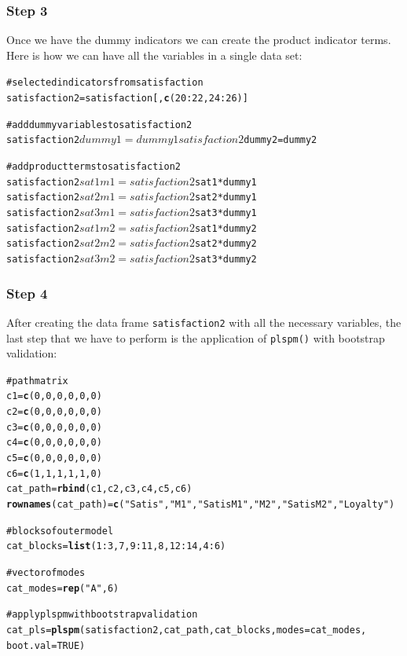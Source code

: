 \documentclass[12pt]{book}\usepackage{graphicx, color}
\makeatletter
\newcommand{\hlfunctioncall}[1]{\textcolor[rgb]{0.501960784313725,0,0.329411764705882}{\textbf{#1}}}%
\newcommand{\hlstring}[1]{\textcolor[rgb]{0.6,0.6,1}{#1}}%
\newcommand{\hlcomment}[1]{\textcolor[rgb]{0.180392156862745,0.6,0.341176470588235}{#1}}%
\newenvironment{kframe}{%
 \def\at@end@of@kframe{}%
 \ifinner\ifhmode%
  \def\at@end@of@kframe{\end{minipage}}%
  \begin{minipage}{\columnwidth}%
 \fi\fi%
 \def\FrameCommand##1{\hskip\@totalleftmargin \hskip-\fboxsep
 \colorbox{shadecolor}{##1}\hskip-\fboxsep
     \hskip-\linewidth \hskip-\@totalleftmargin \hskip\columnwidth}%
 \MakeFramed {\advance\hsize-\width
   \@totalleftmargin\z@ \linewidth\hsize
   \@setminipage}}%
 {\par\unskip\endMakeFramed%
 \at@end@of@kframe}
\newenvironment{knitrout}{}{} %
\newcommand{\fplspm}{\texttt{plspm()}}
\newcommand{\code}[1]{\texttt{#1}}
\makeatother
\begin{document}
\subsubsection*{Step 3}
Once we have the dummy indicators we can create the product indicator terms. Here is how we can have all the variables in a single data set:
\begin{knitrout}
\color{fgcolor}\begin{kframe}
\begin{alltt}
\hlcomment{# selected indicators from satisfaction}
satisfaction2 = satisfaction[, \hlfunctioncall{c}(20:22, 24:26)]

\hlcomment{# add dummy variables to satisfaction2}
satisfaction2$dummy1 = dummy1
satisfaction2$dummy2 = dummy2

\hlcomment{# add product terms to satisfaction2}
satisfaction2$sat1m1 = satisfaction2$sat1 * dummy1
satisfaction2$sat2m1 = satisfaction2$sat2 * dummy1
satisfaction2$sat3m1 = satisfaction2$sat3 * dummy1
satisfaction2$sat1m2 = satisfaction2$sat1 * dummy2
satisfaction2$sat2m2 = satisfaction2$sat2 * dummy2
satisfaction2$sat3m2 = satisfaction2$sat3 * dummy2
\end{alltt}
\end{kframe}
\end{knitrout}


\subsubsection*{Step 4}
After creating the data frame \code{satisfaction2} with all the necessary variables, the last step that we have to perform is the application of \fplspm{} with bootstrap validation:
\begin{knitrout}
\color{fgcolor}\begin{kframe}
\begin{alltt}
\hlcomment{# path matrix}
c1 = \hlfunctioncall{c}(0, 0, 0, 0, 0, 0)
c2 = \hlfunctioncall{c}(0, 0, 0, 0, 0, 0)
c3 = \hlfunctioncall{c}(0, 0, 0, 0, 0, 0)
c4 = \hlfunctioncall{c}(0, 0, 0, 0, 0, 0)
c5 = \hlfunctioncall{c}(0, 0, 0, 0, 0, 0)
c6 = \hlfunctioncall{c}(1, 1, 1, 1, 1, 0)
cat_path = \hlfunctioncall{rbind}(c1, c2, c3, c4, c5, c6)
\hlfunctioncall{rownames}(cat_path) = \hlfunctioncall{c}(\hlstring{"Satis"}, \hlstring{"M1"}, \hlstring{"SatisM1"}, \hlstring{"M2"}, \hlstring{"SatisM2"}, \hlstring{"Loyalty"})

\hlcomment{# blocks of outer model}
cat_blocks = \hlfunctioncall{list}(1:3, 7, 9:11, 8, 12:14, 4:6)

\hlcomment{# vector of modes}
cat_modes = \hlfunctioncall{rep}(\hlstring{"A"}, 6)

\hlcomment{# apply plspm with bootstrap validation}
cat_pls = \hlfunctioncall{plspm}(satisfaction2, cat_path, cat_blocks, modes = cat_modes, 
                boot.val = TRUE)
\end{alltt}
\end{kframe}
\end{knitrout}
\end{document}
